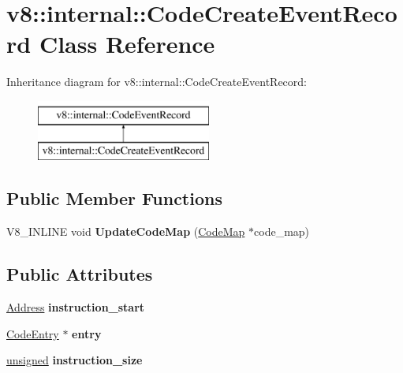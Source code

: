 \hypertarget{classv8_1_1internal_1_1CodeCreateEventRecord}{}\section{v8\+:\+:internal\+:\+:Code\+Create\+Event\+Record Class Reference}
\label{classv8_1_1internal_1_1CodeCreateEventRecord}
Inheritance diagram for v8\+:\+:internal\+:\+:Code\+Create\+Event\+Record\+:\begin{figure}[H]
\begin{center}
\leavevmode
\includegraphics[height=2.000000cm]{classv8_1_1internal_1_1CodeCreateEventRecord}
\end{center}
\end{figure}
\subsection*{Public Member Functions}
\begin{DoxyCompactItemize}
\item 
\mbox{\label{classv8_1_1internal_1_1CodeCreateEventRecord_ade063ee42011d381250cd1c615d46950}} 
V8\+\_\+\+I\+N\+L\+I\+NE void {\bfseries Update\+Code\+Map} (\mbox{\hyperlink{classv8_1_1internal_1_1CodeMap}{Code\+Map}} $\ast$code\+\_\+map)
\end{DoxyCompactItemize}
\subsection*{Public Attributes}
\begin{DoxyCompactItemize}
\item 
\mbox{\label{classv8_1_1internal_1_1CodeCreateEventRecord_a90472516b77232a4a9c1a49e0ea6163c}} 
\mbox{\hyperlink{classuintptr__t}{Address}} {\bfseries instruction\+\_\+start}
\item 
\mbox{\label{classv8_1_1internal_1_1CodeCreateEventRecord_a958cee637aef8a57947e19850e8e75c9}} 
\mbox{\hyperlink{classv8_1_1internal_1_1CodeEntry}{Code\+Entry}} $\ast$ {\bfseries entry}
\item 
\mbox{\label{classv8_1_1internal_1_1CodeCreateEventRecord_a211029b00e416b22a5e3289a86c9ade9}} 
\mbox{\hyperlink{classunsigned}{unsigned}} {\bfseries instruction\+\_\+size}
\end{DoxyCompactItemize}
